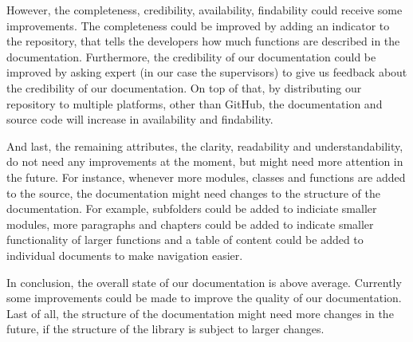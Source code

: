 \documentclass{article}
\begin{document}
    However, the completeness, credibility, availability, findability could receive some improvements. The completeness could be improved by adding an indicator to the repository, that
    tells the developers how much functions are described in the documentation. Furthermore, the credibility of our documentation could be improved by asking expert (in our case the supervisors)
    to give us feedback about the credibility of our documentation. On top of that, by distributing our repository to multiple platforms, other than GitHub, the documentation and source code
    will increase in availability and findability.

    And last, the remaining attributes, the clarity, readability and understandability, do not need any improvements at the moment, but might need more attention in the future. For instance,
    whenever more modules, classes and functions are added to the source, the documentation might need changes to the structure of the documentation. For example, subfolders could be added
    to indiciate smaller modules, more paragraphs and chapters could be added to indicate smaller functionality of larger functions and a table of content could be added to individual documents
    to make navigation easier.

    In conclusion, the overall state of our documentation is above average. Currently some improvements could be made to improve the quality of our documentation. Last of all, the structure
    of the documentation might need more changes in the future, if the structure of the library is subject to larger changes.



\end{document}

